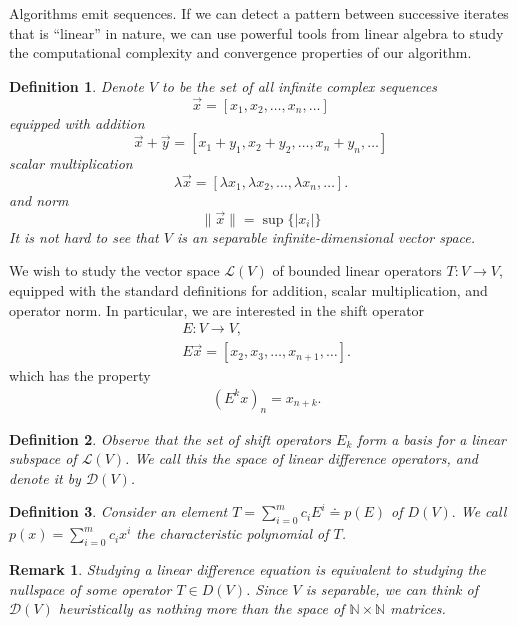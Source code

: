 \documentclass[12pt,reqno]{amsart}
\numberwithin{equation}{section}  %
\newtheorem*{definition}{Definition}
\newtheorem*{remark}{Remark}
\begin{document}
Algorithms emit sequences. If we can detect a pattern between successive
iterates that is ``linear'' in nature, we can use powerful tools from linear
algebra to study the computational complexity and convergence properties of our
algorithm.
\begin{definition}
Denote $V$ to be the set of all infinite complex sequences
\begin{equation*}
\vec{x} = [x_1, x_2, \ldots, x_n, \ldots]
\end{equation*}
equipped with addition
\begin{equation*}
\vec{x} + \vec{y} = [x_1 + y_1, x_2 + y_2, \ldots, x_n + y_n, \ldots]	
\end{equation*}
scalar multiplication
\begin{equation*}
\lambda \vec{x} = [\lambda x_1, \lambda x_2, \ldots, \lambda x_n, \ldots].
\end{equation*}
and norm
\begin{equation*}
\| \vec{x} \| = \sup \{|x_i| \}
\end{equation*}
It is not hard to see that $V$ is an separable infinite-dimensional vector
space.
\end{definition}
We wish to study the vector space $\mathcal{L}(V)$ of bounded linear operators
$T:
V \to V$, equipped with the standard definitions for addition, scalar
multiplication, and operator norm.
In particular, we are interested in the shift operator
\begin{align*}
& E: V \to V,
\\
& E \vec{x} = [x_2, x_3, \ldots, x_{n+1}, \ldots].
\end{align*}
which has the property 
\begin{align*}
& (E^k x)_{n} = x_{n+k}.
\end{align*}
\begin{definition}
Observe that the set of shift operators ${E_k}$ form a basis for a
linear subspace of $\mathcal{L}(V)$. We call this the space of
\emph{linear difference operators}, and denote it by $\mathcal{D}(V)$.
\end{definition}
\begin{definition}
Consider an element $T = \sum_{i=0}^{m}c_i E^i \doteq p(E)$ of $D(V).$ We call
$p(x) = \sum_{i=0}^{m} c_i x^i$ the \emph{characteristic polynomial} of $T$.
\end{definition}
\begin{remark}
Studying a linear difference equation is equivalent to studying the nullspace
of some operator $T \in D(V)$. Since $V$ is separable, we can think of
$\mathcal{D}(V)$ heuristically as nothing more than the space of $\mathbb{N}
\times \mathbb{N}$ matrices. 
\end{remark}
\end{document}
